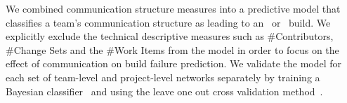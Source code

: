 %
%



We combined communication structure measures into a predictive model
that classifies a team's communication structure as leading to an \error\ or \ok\
build. We explicitly exclude the technical descriptive measures such as
\#Contributors, \#Change Sets and the \#Work Items from the model in order to
focus on the effect of communication on build failure prediction. We validate the
model for each set of team-level and project-level networks separately by
training a Bayesian classifier~\cite{Hastie:2003ys} and using the leave one
out cross validation method~\cite{Hastie:2003ys}.

